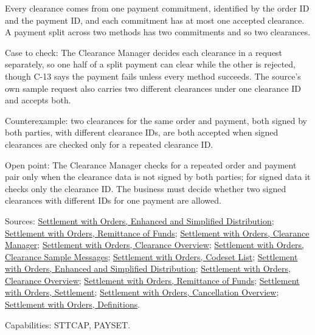\begin{theorem}
  \label{thm:accounting-clearance-per-commitment}
  Every clearance comes from one payment commitment, identified by the order
  ID and the payment ID, and each commitment has at most one accepted
  clearance. A payment split across two methods has two commitments and so
  two clearances.

  Case to check: The Clearance Manager decides each clearance in a request
  separately, so one half of a split payment can clear while the other is
  rejected, though C-13 says the payment fails unless every method succeeds.
  The source's own sample request also carries two different clearances
  under one clearance ID and accepts both.

  Counterexample: two clearances for the same order and payment, both
  signed by both parties, with different clearance IDs, are both accepted
  when signed clearances are checked only for a repeated clearance ID.

  Open point: The Clearance Manager checks for a repeated order and payment
  pair only when the clearance data is not signed by both parties; for
  signed data it checks only the clearance ID. The business must decide
  whether two signed clearances with different IDs for one payment are
  allowed.

  Sources: \href{https://standards.atlassian.net/wiki/spaces/SWO/pages/574653091}{Settlement with Orders, Enhanced and Simplified Distribution};
  \href{https://standards.atlassian.net/wiki/spaces/SWO/pages/574718145}{Settlement with Orders, Remittance of Funds};
  \href{https://standards.atlassian.net/wiki/spaces/SWO/pages/574259794}{Settlement with Orders, Clearance Manager};
  \href{https://standards.atlassian.net/wiki/spaces/SWO/pages/574653069}{Settlement with Orders, Clearance Overview};
  \href{https://standards.atlassian.net/wiki/spaces/SWO/pages/574259772}{Settlement with Orders, Clearance Sample Messages};
  \href{https://standards.atlassian.net/wiki/spaces/SWO/pages/574456090}{Settlement with Orders, Codeset List};
  \href{https://standards.atlassian.net/wiki/spaces/SWO/pages/574653091/Enhanced+and+Simplified+Distribution}{Settlement with Orders, Enhanced and Simplified Distribution};
  \href{https://standards.atlassian.net/wiki/spaces/SWO/pages/574653069/Clearance+Overview}{Settlement with Orders, Clearance Overview};
  \href{https://standards.atlassian.net/wiki/spaces/SWO/pages/574718145/Remittance+of+Funds}{Settlement with Orders, Remittance of Funds};
  \href{https://standards.atlassian.net/wiki/spaces/SWO/pages/574816478/Settlement}{Settlement with Orders, Settlement};
  \href{https://standards.atlassian.net/wiki/spaces/SWO/pages/574587124/Cancellation+Overview}{Settlement with Orders, Cancellation Overview};
  \href{https://standards.atlassian.net/wiki/spaces/SWO/pages/574915056/Definitions}{Settlement with Orders, Definitions}.

  Capabilities: STTCAP, PAYSET.
\end{theorem}
